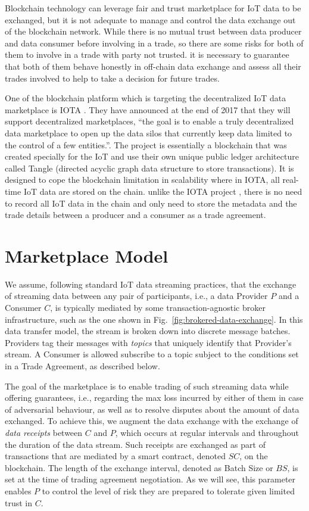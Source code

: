 \documentclass[letterpaper, 10 pt, conference]{ieeeconf}  %
\newcommand{\bs}{\ensuremath{\mathit{BS}}}
\newcommand{\smartc}{\ensuremath{\mathit{SC}}}
\begin{document}
Blockchain technology can leverage fair and trust marketplace for IoT data to be exchanged, but it is not adequate to manage and control the data exchange out of the blockchain network. While there is no mutual trust between data producer and data consumer before involving in a trade, so there are some risks for both of them to involve in a trade with party not trusted. it is necessary to guarantee that both of them behave honestly in off-chain data exchange and assess all their trades involved to help to take a decision for future trades.   

One of the blockchain platform which is targeting the decentralized IoT data marketplace is IOTA \cite{20}. They have announced at the end of 2017 that they will support decentralized marketplaces, “the goal is to enable a truly decentralized data marketplace to open up the data silos that currently keep data limited to the control of a few entities.”. 
The project is essentially a blockchain that was created specially for the IoT and use their own unique public ledger architecture called Tangle (directed acyclic graph data structure to store transactions). 
It is designed to cope the blockchain limitation in scalability where in IOTA, all real-time IoT data are stored on the chain. 
unlike the IOTA project \cite{20}, there is no need to record all IoT data in the chain and only need to store the metadata and the trade details between a producer and a consumer as a trade agreement.

\section{Marketplace Model} \label{sec:MKModel}

We assume, following standard IoT data streaming practices, that the exchange of streaming data between any pair of  participants, i.e., a data Provider  $P$ and a Consumer $C$, is typically mediated by some transaction-agnostic broker infrastructure, such as the one shown in Fig.~\ref{fig:brokered-data-exchange}.
In this data transfer model, the stream is broken down into discrete message batches. Providers tag their messages with \textit{topics} that uniquely identify that Provider's stream. 
A Consumer is allowed subscribe to a topic subject to the conditions set in a Trade Agreement, as described below.

The goal of the marketplace is to enable trading of such streaming data while offering guarantees, i.e., 
regarding the max  loss incurred by either of them in case of adversarial behaviour, as well as to resolve disputes about the amount of data exchanged.
%
To achieve this, we augment the data exchange with the exchange of \textit{data receipts} between $C$ and $P$, which occurs at regular intervals and throughout the duration of the data stream. Such receipts are exchanged as part of transactions that are mediated by a smart contract, denoted \smartc, on the blockchain. 
The length of the exchange interval, denoted as Batch Size or \bs, is set at the time of trading agreement negotiation. 
As we will see, this parameter enables  $P$ to control the level of risk they are prepared to tolerate given limited trust in $C$.
\end{document}
